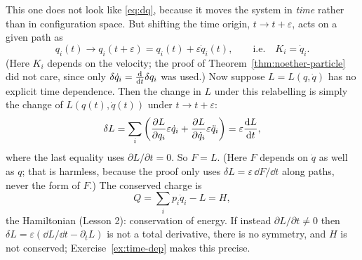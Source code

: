 \documentclass[11pt]{article}
\newcommand{\eps}{\varepsilon}
\begin{document}
\begin{example}
This one does not look like \eqref{eq:dq}, because it moves the system in \emph{time} rather than in configuration space. But shifting the time origin, $t\to t+\eps$, acts on a given path as
\begin{equation}
  q_i(t)\to q_i(t+\eps)=q_i(t)+\eps\dot q_i(t),\qquad\text{i.e.}\quad K_i=\dot q_i .
\end{equation}
(Here $K_i$ depends on the velocity; the proof of Theorem~\ref{thm:noether-particle} did not care, since only $\delta\dot q_i=\frac{\mathrm{d} }{\mathrm{d} t}\delta q_i$ was used.) Now suppose $L=L(q,\dot q)$ has no explicit time dependence. Then the change in $L$ under this relabelling is simply the change of $L(q(t),\dot q(t))$ under $t\to t+\eps$:
\begin{equation}
  \delta L=\sum_i\left(\pdiff{L}{q_i}\eps\dot q_i+\pdiff{L}{\dot q_i}\eps\ddot q_i\right)=\eps\diff{L}{t},
\end{equation}
where the last equality uses $\partial L/\partial t=0$. So $F=L$. (Here $F$ depends on $\dot q$ as well as $q$; that is harmless, because the proof only uses $\delta L=\eps\,\dd F/\dd t$ along paths, never the form of $F$.) The conserved charge is
\begin{equation}
  Q=\sum_ip_i\dot q_i-L=H,
\end{equation}
the Hamiltonian (Lesson 2): conservation of energy. If instead $\partial L/\partial t\ne0$ then $\delta L=\eps(\dd L/\dd t-\partial_tL)$ is not a total derivative, there is no symmetry, and $H$ is not conserved; Exercise~\ref{ex:time-dep} makes this precise.
\end{example}
\end{document}
